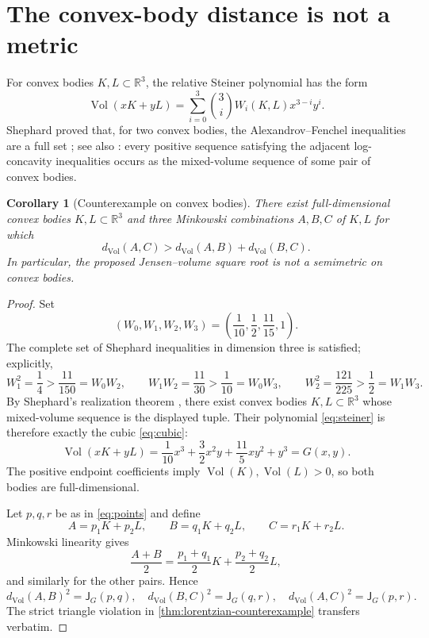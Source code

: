 \documentclass[11pt]{article}
\newtheorem{corollary}[theorem]{Corollary}
\theoremstyle{definition}
\newcommand{\R}{\mathbb{R}}
\newcommand{\J}{\mathsf{J}}
\newcommand{\Vol}{\operatorname{Vol}}
\begin{document}
\section{The convex-body distance is not a metric}

For convex bodies $K,L\subset\R^3$, the relative Steiner polynomial has the form
\begin{equation}\label{eq:steiner}
 \Vol(xK+yL)
 =\sum_{i=0}^3\binom3iW_i(K,L)x^{3-i}y^i.
\end{equation}
Shephard proved that, for two convex bodies, the Alexandrov--Fenchel inequalities are a
full set \cite[Theorem~4]{Shephard}; see also \cite[Lemma~2.1]{HenkHernandezSaorin}: every positive sequence satisfying the adjacent log-concavity inequalities occurs as
the mixed-volume sequence of some pair of convex bodies.

\begin{corollary}[Counterexample on convex bodies]\label{cor:convex-body-counterexample}
There exist full-dimensional convex bodies $K,L\subset\R^3$ and three Minkowski
combinations $A,B,C$ of $K,L$ for which
\[
 d_{\Vol}(A,C)>d_{\Vol}(A,B)+d_{\Vol}(B,C).
\]
In particular, the proposed Jensen--volume square root is not a semimetric on convex bodies.
\end{corollary}

\begin{proof}
Set
\[
 (W_0,W_1,W_2,W_3)
 =\left(\frac1{10},\frac12,\frac{11}{15},1\right).
\]
The complete set of Shephard inequalities in dimension three is satisfied; explicitly,
\[
 W_1^2=\frac14>\frac{11}{150}=W_0W_2,
 \qquad
 W_1W_2=\frac{11}{30}>\frac1{10}=W_0W_3,
 \qquad
 W_2^2=\frac{121}{225}>\frac12=W_1W_3.
\]
By Shephard's realization theorem \cite[Theorem~4]{Shephard}, there exist convex bodies $K,L\subset\R^3$ whose
mixed-volume sequence is the displayed tuple.  Their polynomial \eqref{eq:steiner} is
therefore exactly the cubic \eqref{eq:cubic}:
\[
 \Vol(xK+yL)=\frac1{10}x^3+\frac32x^2y+\frac{11}{5}xy^2+y^3=G(x,y).
\]
The positive endpoint coefficients imply $\Vol(K),\Vol(L)>0$, so both bodies are
full-dimensional.

Let $p,q,r$ be as in \eqref{eq:points} and define
\[
 A=p_1K+p_2L,
 \qquad B=q_1K+q_2L,
 \qquad C=r_1K+r_2L.
\]
Minkowski linearity gives
\[
 \frac{A+B}{2}=\frac{p_1+q_1}{2}K+\frac{p_2+q_2}{2}L,
\]
and similarly for the other pairs.  Hence
\[
 d_{\Vol}(A,B)^2=\J_G(p,q),
 \quad d_{\Vol}(B,C)^2=\J_G(q,r),
 \quad d_{\Vol}(A,C)^2=\J_G(p,r).
\]
The strict triangle violation in \cref{thm:lorentzian-counterexample} transfers verbatim.
\end{proof}
\end{document}
